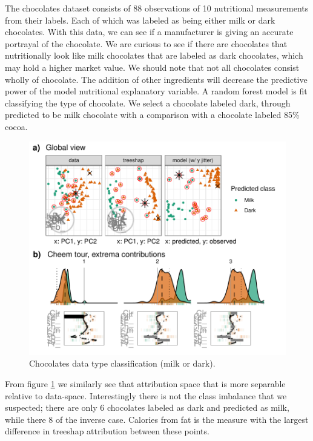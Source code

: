 \documentclass[
]{article}
\begin{document}
The chocolates dataset consists of 88 observations of 10 nutritional measurements from their labels. Each of which was labeled as being either milk or dark chocolates. With this data, we can see if a manufacturer is giving an accurate portrayal of the chocolate. We are curious to see if there are chocolates that nutritionally look like milk chocolates that are labeled as dark chocolates, which may hold a higher market value. We should note that not all chocolates consist wholly of chocolate. The addition of other ingredients will decrease the predictive power of the model nutritional explanatory variable. A random forest model is fit classifying the type of chocolate. We select a chocolate labeled dark, through predicted to be milk chocolate with a comparison with a chocolate labeled 85\% cocoa.

\begin{figure}

{\centering \includegraphics[width=1\linewidth]{./figures/case_chocolates} 

}

\caption{Chocolates data  type classification (milk or dark). }\label{fig:casechocolates}
\end{figure}

From figure \ref{fig:casechocolates} we similarly see that attribution space that is more separable relative to data-space. Interestingly there is not the class imbalance that we suspected; there are only 6 chocolates labeled as dark and predicted as milk, while there 8 of the inverse case. Calories from fat is the measure with the largest difference in treeshap attribution between these points.
\end{document}
